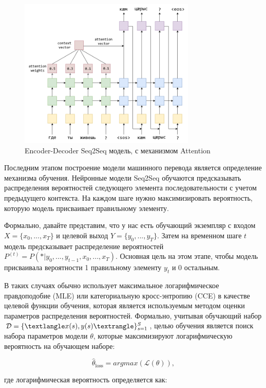 \documentclass[a4paper,12pt]{article}
\begin{document}
	\begin{figure}[ht!]
		\centering
		\captionsetup{justification=centering}
		\includegraphics[width=0.75\textwidth]{img/Model.png}
		\caption{Encoder-Decoder Seq2Seq модель, с механизмом Attention}
	\end{figure}
	
	Последним этапом построение модели машинного перевода является определение механизма обучения. Нейронные модели Seq2Seq обучаются предсказывать распределения вероятностей следующего элемента последовательности с учетом предыдущего контекста. На каждом шаге нужно максимизировать вероятность, которую модель присваивает правильному элементу. 
	
	Формально, давайте представим, что у нас есть обучающий экземпляр с входом  $X = \{ x_0, ... , x_T \}$ и целевой выход $Y = \{ y_0, ... , y_T \}$. Затем на временном шаге $t$ модель предсказывает распределение вероятностей $P^{(t)} = P(*|y_0, ..., y_{t - 1}, x_0, ..., x_{T})$. Основная цель на этом этапе, чтобы модель присваивала вероятности 1 правильному элементу $y_t$ и 0 остальным.
	
	В таких случаях обычно использует максимальное логарифмическое правдоподобие (MLE) или категориальную кросс-энтропию (CCE) в качестве целевой функции обучения, которая является используемым методом оценки параметров распределения вероятностей. Формально, учитывая обучающий набор $ \mathcal{D} = \{\textlangle x(s), y(s) \textrangle\}_{s=1}^S $, целью обучения является поиск набора параметров модели $\theta$, которые максимизируют логарифмическую вероятность на обучающем наборе:
	
	$$
	    \hat{\theta}_{\text{loss}} = argmax(\mathscr{L}(\theta)),
	$$

    где логарифмическая вероятность определяется как:
    
\end{document}
